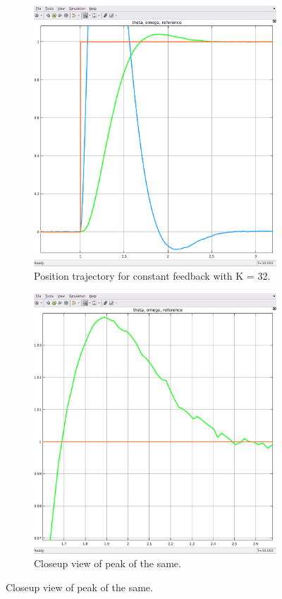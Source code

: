 \documentclass[11pt,a4paper]{article}
\begin{document}
\begin{figure}[h!]
	\centering
	\begin{subfigure}{.5\textwidth}
		\centering
		\includegraphics[width = \textwidth]{imglab/lab4sol_constanttraj.png}
		\caption{Position trajectory for constant feedback with K = 32.}
	\end{subfigure}%
	\begin{subfigure}{.5\textwidth}
		\centering
		\includegraphics[width = \textwidth]{imglab/lab4sol_constanttrajclose.png}
		\caption{Closeup view of peak of the same.}	
	\end{subfigure}
\end{figure}
\end{document}
